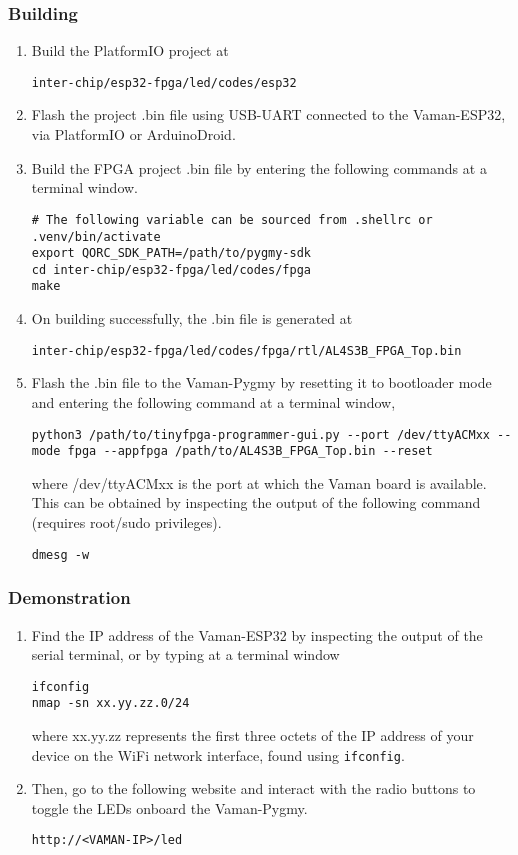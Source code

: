 \subsubsection{Building}
\begin{enumerate}
    \item Build the PlatformIO project at
    \begin{lstlisting}
inter-chip/esp32-fpga/led/codes/esp32
    \end{lstlisting}
    \item Flash the project .bin file using USB-UART connected to the 
    Vaman-ESP32, via PlatformIO or ArduinoDroid.
    \item Build the FPGA project .bin file by entering the following commands at
    a terminal window.
    \begin{lstlisting}
# The following variable can be sourced from .shellrc or .venv/bin/activate
export QORC_SDK_PATH=/path/to/pygmy-sdk
cd inter-chip/esp32-fpga/led/codes/fpga
make
    \end{lstlisting}
    \item On building successfully, the .bin file is generated at
    \begin{lstlisting}
inter-chip/esp32-fpga/led/codes/fpga/rtl/AL4S3B_FPGA_Top.bin
    \end{lstlisting}
    \item Flash the .bin file to the Vaman-Pygmy by resetting it to bootloader
    mode and entering the following command at a terminal window,
    \begin{lstlisting}
python3 /path/to/tinyfpga-programmer-gui.py --port /dev/ttyACMxx --mode fpga --appfpga /path/to/AL4S3B_FPGA_Top.bin --reset
    \end{lstlisting}
    where /dev/ttyACMxx is the port at which the Vaman board is available. This
    can be obtained by inspecting the output of the following command (requires
    root/sudo privileges).
    \begin{lstlisting}
dmesg -w
    \end{lstlisting}
\end{enumerate}

\subsubsection{Demonstration}
\begin{enumerate}[resume]
    \item Find the IP address of the Vaman-ESP32 by inspecting the output of the
    serial terminal, or by typing at a terminal window
    \begin{lstlisting}
ifconfig
nmap -sn xx.yy.zz.0/24
    \end{lstlisting}
    where xx.yy.zz represents the first three octets of the IP address of your
    device on the WiFi network interface, found using \texttt{ifconfig}.
    \item Then, go to the following website and interact with the radio buttons
    to toggle the LEDs onboard the Vaman-Pygmy. 
    \begin{lstlisting}
http://<VAMAN-IP>/led
    \end{lstlisting}
\end{enumerate}

